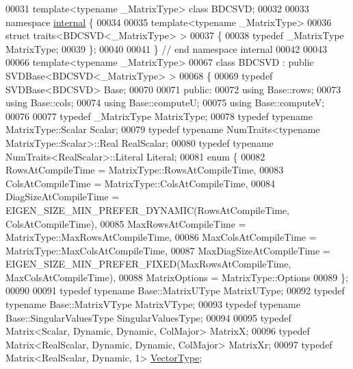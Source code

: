 \begin{DoxyCode}
00031 \textcolor{keyword}{template}<\textcolor{keyword}{typename} \_MatrixType> \textcolor{keyword}{class }BDCSVD;
00032 
00033 \textcolor{keyword}{namespace }\hyperlink{namespaceinternal}{internal} \{
00034 
00035 \textcolor{keyword}{template}<\textcolor{keyword}{typename} \_MatrixType> 
00036 \textcolor{keyword}{struct }traits<BDCSVD<\_MatrixType> >
00037 \{
00038   \textcolor{keyword}{typedef} \_MatrixType MatrixType;
00039 \};  
00040 
00041 \} \textcolor{comment}{// end namespace internal}
00042   
00043   
00066 \textcolor{keyword}{template}<\textcolor{keyword}{typename} \_MatrixType> 
00067 \textcolor{keyword}{class }BDCSVD : \textcolor{keyword}{public} SVDBase<BDCSVD<\_MatrixType> >
00068 \{
00069   \textcolor{keyword}{typedef} SVDBase<BDCSVD> Base;
00070     
00071 \textcolor{keyword}{public}:
00072   \textcolor{keyword}{using} Base::rows;
00073   \textcolor{keyword}{using} Base::cols;
00074   \textcolor{keyword}{using} Base::computeU;
00075   \textcolor{keyword}{using} Base::computeV;
00076   
00077   \textcolor{keyword}{typedef} \_MatrixType MatrixType;
00078   \textcolor{keyword}{typedef} \textcolor{keyword}{typename} MatrixType::Scalar Scalar;
00079   \textcolor{keyword}{typedef} \textcolor{keyword}{typename} NumTraits<typename MatrixType::Scalar>::Real RealScalar;
00080   \textcolor{keyword}{typedef} \textcolor{keyword}{typename} NumTraits<RealScalar>::Literal Literal;
00081   \textcolor{keyword}{enum} \{
00082     RowsAtCompileTime = MatrixType::RowsAtCompileTime, 
00083     ColsAtCompileTime = MatrixType::ColsAtCompileTime, 
00084     DiagSizeAtCompileTime = EIGEN\_SIZE\_MIN\_PREFER\_DYNAMIC(RowsAtCompileTime, ColsAtCompileTime), 
00085     MaxRowsAtCompileTime = MatrixType::MaxRowsAtCompileTime, 
00086     MaxColsAtCompileTime = MatrixType::MaxColsAtCompileTime, 
00087     MaxDiagSizeAtCompileTime = EIGEN\_SIZE\_MIN\_PREFER\_FIXED(MaxRowsAtCompileTime, MaxColsAtCompileTime), 
00088     MatrixOptions = MatrixType::Options
00089   \};
00090 
00091   \textcolor{keyword}{typedef} \textcolor{keyword}{typename} Base::MatrixUType MatrixUType;
00092   \textcolor{keyword}{typedef} \textcolor{keyword}{typename} Base::MatrixVType MatrixVType;
00093   \textcolor{keyword}{typedef} \textcolor{keyword}{typename} Base::SingularValuesType SingularValuesType;
00094   
00095   \textcolor{keyword}{typedef} Matrix<Scalar, Dynamic, Dynamic, ColMajor> MatrixX;
00096   \textcolor{keyword}{typedef} Matrix<RealScalar, Dynamic, Dynamic, ColMajor> MatrixXr;
00097   \textcolor{keyword}{typedef} Matrix<RealScalar, Dynamic, 1> \hyperlink{struct_vector_type}{VectorType};

\end{DoxyCode}
